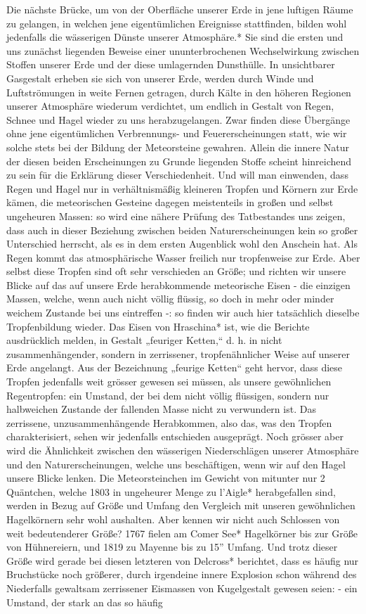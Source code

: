 \documentclass[a4paper, 8pt, oneside, polutonikogreek, german]{article}
\begin{document}
Die nächste Brücke, um von der Oberfläche unserer Erde in jene luftigen Räume zu gelangen, in welchen jene eigentümlichen Ereignisse stattfinden, bilden wohl jedenfalls die wässerigen Dünste unserer Atmosphäre.* Sie sind die ersten und uns zunächst liegenden Beweise einer ununterbrochenen Wechselwirkung zwischen Stoffen unserer Erde und der diese umlagernden Dunsthülle. In unsichtbarer Gasgestalt erheben sie sich von unserer Erde, werden durch Winde und Luftströmungen in weite Fernen getragen, durch Kälte in den höheren Regionen unserer Atmosphäre wiederum verdichtet, um endlich in Gestalt von Regen, Schnee und Hagel wieder zu uns herabzugelangen. Zwar finden diese Übergänge ohne jene eigentümlichen Verbrennungs- und Feuererscheinungen statt, wie wir solche stets bei der Bildung der Meteorsteine gewahren. Allein die innere Natur der diesen beiden Erscheinungen zu Grunde liegenden Stoffe scheint hinreichend zu sein für die Erklärung dieser Verschiedenheit. Und will man einwenden, dass Regen und Hagel nur in verhältnismäßig kleineren Tropfen und Körnern zur Erde kämen, die meteorischen Gesteine dagegen meistenteils in großen und selbst ungeheuren Massen: so wird eine nähere Prüfung des Tatbestandes uns zeigen, dass auch in dieser Beziehung zwischen beiden Naturerscheinungen kein so großer Unterschied herrscht, als es in dem ersten Augenblick wohl den Anschein hat. Als Regen kommt das atmosphärische Wasser freilich nur tropfenweise zur Erde. Aber selbst diese Tropfen sind oft sehr verschieden an Größe; und richten wir unsere Blicke auf das auf unsere Erde herabkommende meteorische Eisen - die einzigen Massen, welche, wenn auch nicht völlig flüssig, so doch in mehr oder minder weichem Zustande bei uns eintreffen -: so finden wir auch hier tatsächlich dieselbe Tropfenbildung wieder. Das Eisen von Hraschina* ist, wie die Berichte ausdrücklich melden, in Gestalt „feuriger Ketten,“ d. h. in nicht zusammenhängender, sondern in zerrissener, tropfenähnlicher Weise auf unserer Erde angelangt. Aus der Bezeichnung „feurige Ketten“ geht hervor, dass diese Tropfen jedenfalls weit grösser gewesen sei müssen, als unsere gewöhnlichen Regentropfen: ein Umstand, der bei dem nicht völlig flüssigen, sondern nur halbweichen Zustande der fallenden Masse nicht zu verwundern ist. Das zerrissene, unzusammenhängende Herabkommen, also das, was den Tropfen charakterisiert, sehen wir jedenfalls entschieden ausgeprägt. Noch grösser aber wird die Ähnlichkeit zwischen den wässerigen Niederschlägen unserer Atmosphäre und den Naturerscheinungen, welche uns beschäftigen, wenn wir auf den Hagel unsere Blicke lenken. Die Meteorsteinchen im Gewicht von mitunter nur 2 Quäntchen, welche 1803 in ungeheurer Menge zu l'Aigle* herabgefallen sind, werden in Bezug auf Größe und Umfang den Vergleich mit unseren gewöhnlichen Hagelkörnern sehr wohl aushalten. Aber kennen wir nicht auch Schlossen von weit bedeutenderer Größe? 1767 fielen am Comer See* Hagelkörner bis zur Größe von Hühnereiern, und 1819 zu Mayenne bis zu 15'' Umfang. Und trotz dieser Größe wird gerade bei diesen letzteren von Delcross* berichtet, dass es häufig nur Bruchstücke noch größerer, durch irgendeine innere Explosion schon während des Niederfalls gewaltsam zerrissener Eismassen von Kugelgestalt gewesen seien: - ein Umstand, der stark an das so häufig 
\end{document}
